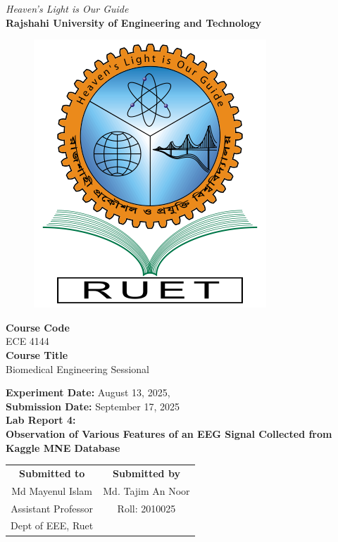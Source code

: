 \vspace*{\fill}
\begin{center}

    \emph{Heaven's Light is Our Guide} \\
    \textbf{Rajshahi University of Engineering and Technology} \\

    \begin{figure}[H]
        \centering
        \includegraphics[scale=.34]{images/RUET_logo.png}
        \label{fig:ruet_logo}
    \end{figure}
    \vspace{5mm}

    \textbf{Course Code}\\
    ECE 4144\\
    \vspace{3mm}
    \textbf{Course Title}\\
    Biomedical Engineering Sessional

    \vspace{5mm}
    \textbf{Experiment Date:} {August 13, 2025},\\
    \textbf{Submission Date:} {September 17, 2025}\\

    \vspace{5mm}
    \textbf{Lab Report 4: \\
        Observation of Various Features of an EEG Signal Collected from Kaggle MNE Database}

    \vspace{15mm}

    \begin{tabular}{c|c}
        \textbf{Submitted to} & \textbf{Submitted by} \\
        Md Mayenul Islam      & Md. Tajim An Noor     \\
        Assistant Professor   & Roll: 2010025         \\
        Dept of EEE, Ruet     &                       \\
    \end{tabular}

\end{center}
\vspace*{\fill}
